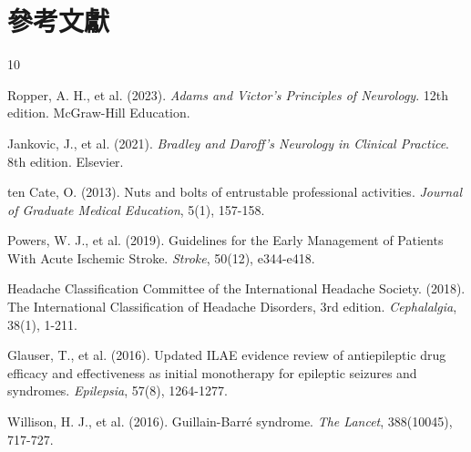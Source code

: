 \documentclass[12pt,a4paper]{article}
\begin{document}
\section{參考文獻}
\begin{thebibliography}{10}

Ropper, A. H., et al. (2023). \textit{Adams and Victor's Principles of Neurology}. 12th edition. McGraw-Hill Education.

Jankovic, J., et al. (2021). \textit{Bradley and Daroff's Neurology in Clinical Practice}. 8th edition. Elsevier.

ten Cate, O. (2013). Nuts and bolts of entrustable professional activities. \textit{Journal of Graduate Medical Education}, 5(1), 157-158.

Powers, W. J., et al. (2019). Guidelines for the Early Management of Patients With Acute Ischemic Stroke. \textit{Stroke}, 50(12), e344-e418.

Headache Classification Committee of the International Headache Society. (2018). The International Classification of Headache Disorders, 3rd edition. \textit{Cephalalgia}, 38(1), 1-211.

Glauser, T., et al. (2016). Updated ILAE evidence review of antiepileptic drug efficacy and effectiveness as initial monotherapy for epileptic seizures and syndromes. \textit{Epilepsia}, 57(8), 1264-1277.

Willison, H. J., et al. (2016). Guillain-Barré syndrome. \textit{The Lancet}, 388(10045), 717-727.

\end{thebibliography}
\end{document}
